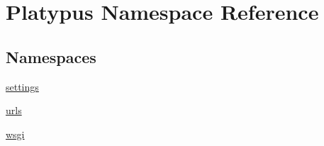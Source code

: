 \hypertarget{namespace_platypus}{}\section{Platypus Namespace Reference}
\label{namespace_platypus}
\subsection*{Namespaces}
\begin{DoxyCompactItemize}
\item 
 \hyperlink{namespace_platypus_1_1settings}{settings}
\item 
 \hyperlink{namespace_platypus_1_1urls}{urls}
\item 
 \hyperlink{namespace_platypus_1_1wsgi}{wsgi}
\end{DoxyCompactItemize}
